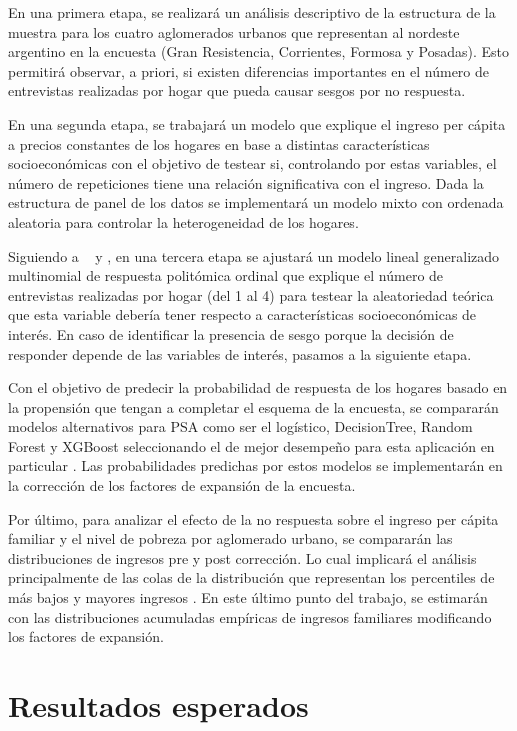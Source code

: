 \documentclass{article}
\begin{document}
En una primera etapa, se realizará un análisis descriptivo de la estructura de la muestra para los cuatro aglomerados urbanos que representan al nordeste argentino en la encuesta (Gran Resistencia, Corrientes, Formosa y Posadas). Esto permitirá observar, a priori, si existen diferencias importantes en el número de entrevistas realizadas por hogar que pueda causar sesgos por no respuesta.

En una segunda etapa, se trabajará un modelo que explique el ingreso per cápita a precios constantes de los hogares en base a distintas características socioeconómicas con el objetivo de testear si, controlando por estas variables, el número de repeticiones tiene una relación significativa con el ingreso. Dada la estructura de panel de los datos se implementará un modelo mixto con ordenada aleatoria para controlar la heterogeneidad de los hogares.

Siguiendo a ~ \cite{korinek07} y \cite{handbook}, en una tercera etapa se ajustará un modelo lineal generalizado multinomial de respuesta politómica ordinal que explique el número de entrevistas realizadas por hogar (del 1 al 4) para testear la aleatoriedad teórica que esta variable debería tener respecto a características socioeconómicas de interés. En caso de identificar la presencia de sesgo porque la decisión de responder depende de las variables de interés, pasamos a la siguiente etapa. 

Con el objetivo de predecir la probabilidad de respuesta de los hogares basado en la propensión que tengan a completar el esquema de la encuesta, se compararán modelos alternativos para PSA como ser el logístico, DecisionTree, Random Forest y XGBoost seleccionando el de mejor desempeño para esta aplicación en particular \cite{methodsml}. Las probabilidades predichas por estos modelos se implementarán en la corrección de los factores de expansión de la encuesta.

Por último, para analizar el efecto de la no respuesta sobre el ingreso per cápita familiar y el nivel de pobreza por aglomerado urbano, se compararán las distribuciones de ingresos pre y post corrección. Lo cual implicará el análisis principalmente de las colas de la distribución que representan los percentiles de más bajos y mayores ingresos \cite{korinek07}. En este último punto del trabajo, se estimarán con las distribuciones acumuladas empíricas de ingresos familiares modificando los factores de expansión.

\section{Resultados esperados}
\end{document}
